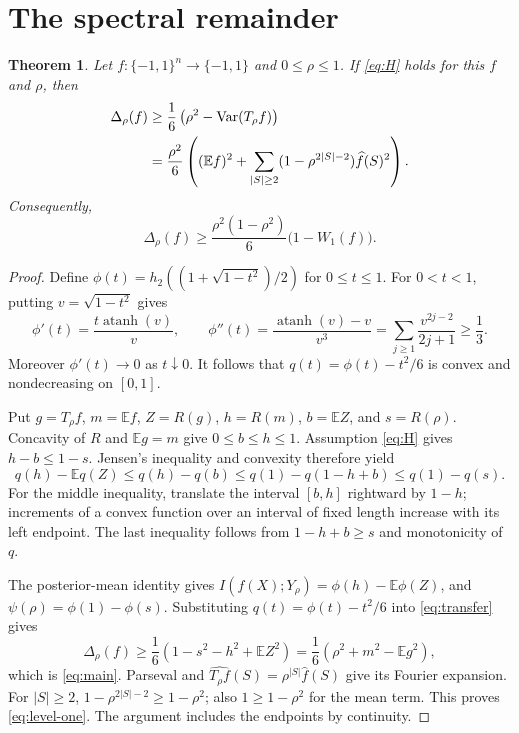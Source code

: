 \documentclass[11pt]{article}
\newtheorem{theorem}{Theorem}
\newcommand{\E}{\mathbb E}
\newcommand{\Var}{\operatorname{Var}}
\begin{document}
\section{The spectral remainder}
\begin{theorem}\label{thm:main}
Let $f:\{-1,1\}^n\to\{-1,1\}$ and $0\le\rho\le1$.
If \eqref{eq:H} holds for this $f$ and $\rho$, then
\begin{align}
 \Delta_\rho(f)
 &\ge\frac16\left(\rho^2-\Var(T_\rho f)\right)\label{eq:main}\\
 &=\frac{\rho^2}{6}\left((\E f)^2+
 \sum_{|S|\ge2}(1-\rho^{2|S|-2})\widehat f(S)^2\right).\notag
\end{align}
Consequently,
\begin{equation}\label{eq:level-one}
 \Delta_\rho(f)\ge\frac{\rho^2(1-\rho^2)}6\bigl(1-W_1(f)\bigr).
\end{equation}
\end{theorem}
\begin{proof}
Define $\phi(t)=h_2((1+\sqrt{1-t^2})/2)$ for $0\le t\le1$.
For $0<t<1$, putting $v=\sqrt{1-t^2}$ gives
\[
 \phi'(t)=\frac{t\operatorname{atanh}(v)}v,\qquad
 \phi''(t)=\frac{\operatorname{atanh}(v)-v}{v^3}
 =\sum_{j\ge1}\frac{v^{2j-2}}{2j+1}\ge\frac13.
\]
Moreover $\phi'(t)\to0$ as $t\downarrow0$. It follows that
$q(t)=\phi(t)-t^2/6$ is convex and nondecreasing on $[0,1]$.

Put $g=T_\rho f$, $m=\E f$, $Z=R(g)$,
$h=R(m)$, $b=\E Z$, and $s=R(\rho)$.
Concavity of $R$ and $\E g=m$ give $0\le b\le h\le1$.
Assumption \eqref{eq:H} gives $h-b\le1-s$.
Jensen's inequality and convexity therefore yield
\begin{equation}\label{eq:transfer}
 q(h)-\E q(Z)\le q(h)-q(b)
 \le q(1)-q(1-h+b)\le q(1)-q(s).
\end{equation}
For the middle inequality, translate the interval $[b,h]$ rightward
by $1-h$; increments of a convex function over an interval of fixed
length increase with its left endpoint. The last inequality follows
from $1-h+b\ge s$ and monotonicity of $q$.

The posterior-mean identity gives
$I(f(X);Y_\rho)=\phi(h)-\E\phi(Z)$, and
$\psi(\rho)=\phi(1)-\phi(s)$. Substituting
$q(t)=\phi(t)-t^2/6$ into \eqref{eq:transfer} gives
\[
 \Delta_\rho(f)\ge\frac16(1-s^2-h^2+\E Z^2)
 =\frac16(\rho^2+m^2-\E g^2),
\]
which is \eqref{eq:main}. Parseval and
$\widehat{T_\rho f}(S)=\rho^{|S|}\widehat f(S)$ give its Fourier
expansion. For $|S|\ge2$, $1-\rho^{2|S|-2}\ge1-\rho^2$;
also $1\ge1-\rho^2$ for the mean term. This proves
\eqref{eq:level-one}. The argument includes the endpoints by continuity.
\end{proof}
\end{document}
